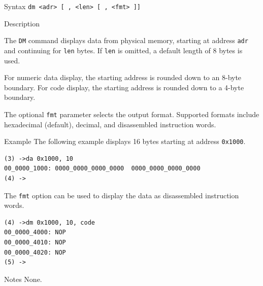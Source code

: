 %
%
\pagebreak
{}

\begin{iPageDescEntry}{Syntax}
\texttt{dm <adr> [ , <len> [ , <fmt> ]]}
\end{iPageDescEntry}

\begin{iPageDescEntry}{Description}

The \texttt{DM} command displays data from physical memory, starting at address
\texttt{adr} and continuing for \texttt{len} bytes. If \texttt{len} is omitted,
a default length of 8 bytes is used.

For numeric data display, the starting address is rounded down to an 8-byte
boundary. For code display, the starting address is rounded down to a 4-byte
boundary.

The optional \texttt{fmt} parameter selects the output format. Supported formats
include hexadecimal (default), decimal, and disassembled instruction words.

\end{iPageDescEntry}

\begin{iPageDescEntry}{Example}
The following example displays 16 bytes starting at address \texttt{0x1000}.

\begin{lstlisting}[style=iPageOpStyle]
(3) ->da 0x1000, 10 
00_0000_1000: 0000_0000_0000_0000  0000_0000_0000_0000
(4) ->   
\end{lstlisting}

The \texttt{fmt} option can be used to display the data as disassembled
instruction words.

\begin{lstlisting}[style=iPageOpStyle]
(4) ->dm 0x1000, 10, code
00_0000_4000: NOP
00_0000_4010: NOP
00_0000_4020: NOP
(5) ->
\end{lstlisting}

\end{iPageDescEntry}

\begin{iPageDescEntry}{Notes}
None.
\end{iPageDescEntry}
